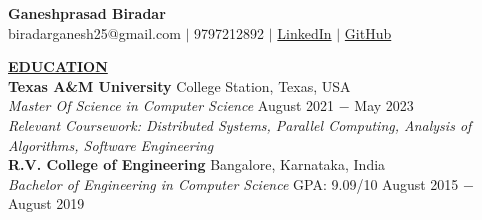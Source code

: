 \documentclass{article}
\begin{document}
\begin{center}
\large \textbf{Ganeshprasad Biradar \\}
\normalsize biradarganesh25@gmail.com $\mid$ 9797212892 $\mid$ \href{https://www.linkedin.com/in/biradarganesh25}{LinkedIn} $\mid$ \href{https://github.com/biradarganesh25}{GitHub} \\
\hrulefill
\end{center}





\noindent \textbf{\underline{EDUCATION}} \\
\textbf{Texas A\&M University} \hfill College Station, Texas, USA \\
\textit{Master Of Science in Computer Science}  \hfill August 2021 $-$ May 2023 \\
\textit{Relevant Coursework: Distributed Systems, Parallel Computing, Analysis of Algorithms, Software Engineering}\\

\noindent \textbf{R.V. College of Engineering} \hfill Bangalore, Karnataka, India \\
\textit{Bachelor of Engineering in Computer Science} \hspace{1.1cm} GPA: 9.09/10 \hfill August 2015 $-$ August 2019 \\
\end{document}
